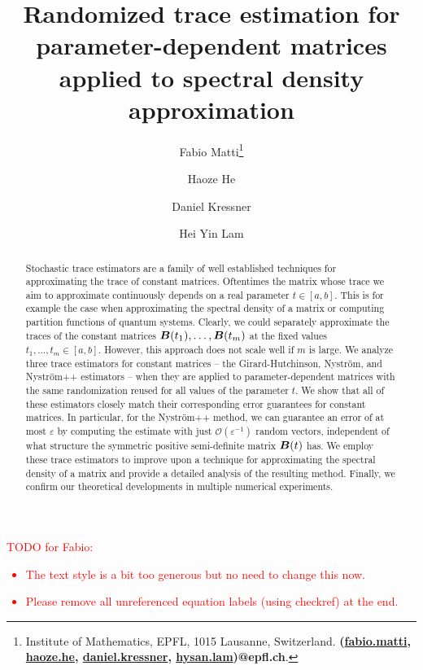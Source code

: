 \documentclass[11pt]{article}
\title{Randomized trace estimation for parameter-dependent matrices applied to spectral density approximation}
\author{Fabio Matti\thanks{Institute of Mathematics, EPFL, 1015 Lausanne, Switzerland. {\textbf{(\href{mailto:fabio.matti@epfl.ch}{fabio.matti}, \href{mailto:haoze.he@epfl.ch}{haoze.he}, \href{mailto:daniel.kressner@epfl.ch}{daniel.kressner}, \href{mailto:hysan.lam@epfl.ch}{hysan.lam})@epfl.ch}}.}
\and Haoze He\footnotemark[1]
\and Daniel Kressner\footnotemark[1]
\and Hei Yin Lam\footnotemark[1]}
\begin{document}
\maketitle



\begin{abstract}
    Stochastic trace estimators are a family of well established techniques for approximating the trace of constant matrices. Oftentimes the matrix whose trace we aim to approximate continuously depends on a real parameter $t \in [a,b]$. This is for example the case when approximating the spectral density of a matrix or computing partition functions of quantum systems. Clearly, we could separately approximate the traces of the constant matrices $\boldsymbol{B}(t_1), \dots, \boldsymbol{B}(t_m)$ at the fixed values $t_1, \dots, t_m \in [a, b]$. However, this approach does not scale well if $m$ is large. We analyze three trace estimators for constant matrices -- the Girard-Hutchinson, Nyström, and Nyström++ estimators -- when they are applied to parameter-dependent matrices with the same randomization reused for all values of the parameter $t$. We show that all of these estimators closely match their corresponding error guarantees for constant matrices. In particular, for the Nyström++ method, we can guarantee an error of at most $\varepsilon$ by computing the estimate with just $\mathcal{O}(\varepsilon^{-1})$ random vectors, independent of what structure the symmetric positive semi-definite matrix $\boldsymbol{B}(t)$ has. We employ these trace estimators to improve upon a technique for approximating the spectral density of a matrix and provide a detailed analysis of the resulting method. Finally, we confirm our theoretical developments in multiple numerical experiments.
\end{abstract}

\textcolor{red}{TODO for Fabio:
\begin{itemize}
 \item The text style is a bit too generous but no need to change this now.
 \item Please remove all unreferenced equation labels (using checkref) at the end.
\end{itemize}
}
\color{blue}




\end{document}
